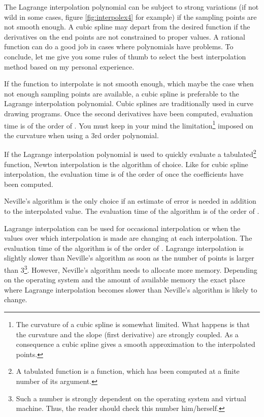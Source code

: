 \documentclass[twoside]{book}
\begin{document}
The Lagrange interpolation polynomial can be subject to strong
variations (if not wild in some cases, figure
\ref{fig:interpolex4} for example) if the sampling points are not
smooth enough. A cubic spline may depart from the desired function
if the derivatives on the end points are not constrained to proper
values. A rational function can do a good job in cases where
polynomials have problems. To conclude, let me give you some rules
of thumb to select the best interpolation method based on my
personal experience.

If the function to interpolate is not smooth enough, which maybe
the case when not enough sampling points are available, a cubic
spline is preferable to the Lagrange interpolation polynomial.
Cubic splines are traditionally used in curve drawing programs.
Once the second derivatives have been computed, evaluation time is
of the order of . You must keep in your mind the
limitation\footnote{The curvature of a cubic spline is somewhat
limited. What happens is that the curvature and the slope (first
derivative) are strongly coupled. As a consequence a cubic spline
gives a smooth approximation to the interpolated points.} imposed
on the curvature when using a 3rd order polynomial.

If the Lagrange interpolation polynomial is used to quickly
evaluate a tabulated\footnote{A tabulated function is a function,
which has been computed at a finite number of its argument.}
function, Newton interpolation is the algorithm of choice. Like
for cubic spline interpolation, the evaluation time is of the
order of  once the coefficients have been computed.

Neville's algorithm is the only choice if an estimate of error is
needed in addition to the interpolated value. The evaluation time
of the algorithm is of the order of .

Lagrange interpolation can be used for occasional interpolation or
when the values over which interpolation is made are changing at
each interpolation. The evaluation time of the algorithm is of the
order of . Lagrange interpolation is slightly slower than
Neville's algorithm as soon as the number of points is larger than
3\footnote{\label{ft:lagnev}Such a number is strongly dependent on
the operating system and virtual machine. Thus, the reader should
check this number him/herself.}. However, Neville's algorithm
needs to allocate more memory. Depending on the operating system
and the amount of available memory the exact place where Lagrange
interpolation becomes slower than Neville's algorithm is likely to
change.
\end{document}
